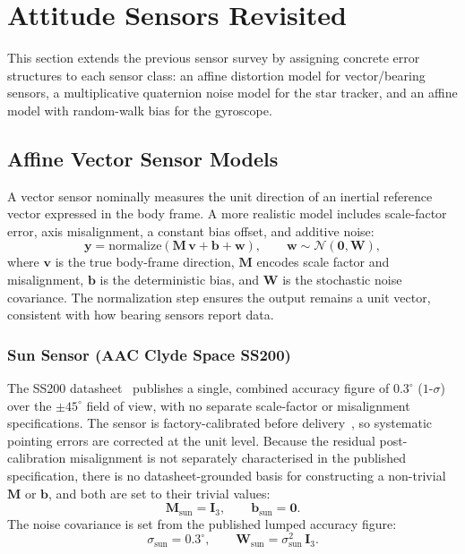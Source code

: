 \section{Attitude Sensors Revisited}
\label{sec:sensors_revisited}

This section extends the previous sensor survey by assigning concrete error structures
to each sensor class: an affine distortion model for vector/bearing sensors, a
multiplicative quaternion noise model for the star tracker, and an affine model
with random-walk bias for the gyroscope.

\subsection{Affine Vector Sensor Models}
\label{sec:affine_vector}

A vector sensor nominally measures the unit direction of an inertial
reference vector expressed in the body frame.  A more realistic model includes
scale-factor error, axis misalignment, a constant bias offset, and additive noise:
\begin{equation}
  \mathbf{y} = \mathrm{normalize}\!\left(
    \mathbf{M}\,\mathbf{v} + \mathbf{b} + \mathbf{w}
  \right), \qquad \mathbf{w} \sim \mathcal{N}(\mathbf{0}, \mathbf{W}),
\end{equation}
where $\mathbf{v}$ is the true body-frame direction, $\mathbf{M}$ encodes scale
factor and misalignment, $\mathbf{b}$ is the deterministic bias, and $\mathbf{W}$
is the stochastic noise covariance.  The normalization step ensures the output
remains a unit vector, consistent with how bearing sensors report data.

\subsubsection*{Sun Sensor (AAC Clyde Space SS200)}

The SS200 datasheet~\cite{AAC_SS200} publishes a single, combined accuracy
figure of $0.3^\circ$ ($1$-$\sigma$) over the $\pm45^\circ$ field of view,
with no separate scale-factor or misalignment specifications.
The sensor is factory-calibrated before delivery~\cite{AAC_SS200}, so
systematic pointing errors are corrected at the unit level.  Because the
residual post-calibration misalignment is not separately characterised in the
published specification, there is no datasheet-grounded basis for constructing
a non-trivial $\mathbf{M}$ or $\mathbf{b}$, and both are set to their trivial
values:
\begin{equation}
  \mathbf{M}_\mathrm{sun} = \mathbf{I}_3, \qquad
  \mathbf{b}_\mathrm{sun} = \mathbf{0}.
\end{equation}
The noise covariance is set from the published lumped accuracy figure:
\begin{equation}
  \sigma_\mathrm{sun} = 0.3^\circ, \qquad
  \mathbf{W}_\mathrm{sun} = \sigma_\mathrm{sun}^2\,\mathbf{I}_3.
\end{equation}

